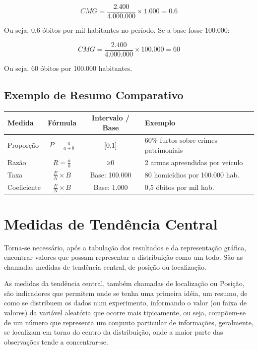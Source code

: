 \[
CMG = \frac{2.400}{4.000.000} \times 1.000 = 0.6
\]

Ou seja, 0,6 óbitos por mil habitantes no período.  
Se a base fosse 100.000:

\[
CMG = \frac{2.400}{4.000.000} \times 100.000 = 60
\]
\vskip0.3cm

Ou seja, 60 óbitos por 100.000 habitantes.

\subsection*{Exemplo de Resumo Comparativo}

\begin{center}
\begin{tabular}{|l|c|c|l|}
\hline
\textbf{Medida} & \textbf{Fórmula} & \textbf{Intervalo / Base} & \textbf{Exemplo} \\
\hline
Proporção & $P = \frac{a}{a+b}$ & [0,1] & 60\% furtos sobre crimes patrimoniais \\
\hline
Razão & $R = \frac{a}{b}$ & ≥0 & 2 armas apreendidas por veículo \\
\hline
Taxa & $\frac{E}{N} \times B$ & Base:  100.000 & 80 homicídios por 100.000 hab. \\
\hline
Coeficiente & $\frac{E}{N} \times B$ & Base: 1.000  & 0,5 óbitos por mil hab. \\
\hline
\end{tabular}
\end{center}


\newpage
\section{Medidas de Tendência Central}

Torna-se necessário, após a tabulação dos resultados e da representação gráfica, encontrar valores que possam representar a distribuição como um todo. São as chamadas medidas de tendência central, de posição ou localização.\vskip0.3cm

As medidas da tendência central, também chamadas de localização ou Posição, são indicadores que permitem onde se tenha uma primeira idéia, um resumo, de como se distribuem os dados num experimento, informando o valor (ou faixa de valores) da variável aleatória que ocorre mais tipicamente, ou seja, compõem-se de um número que representa um conjunto particular de informações, geralmente, se localizam em torno do centro da distribuição, onde a maior parte das observações tende a concentrar-se.


